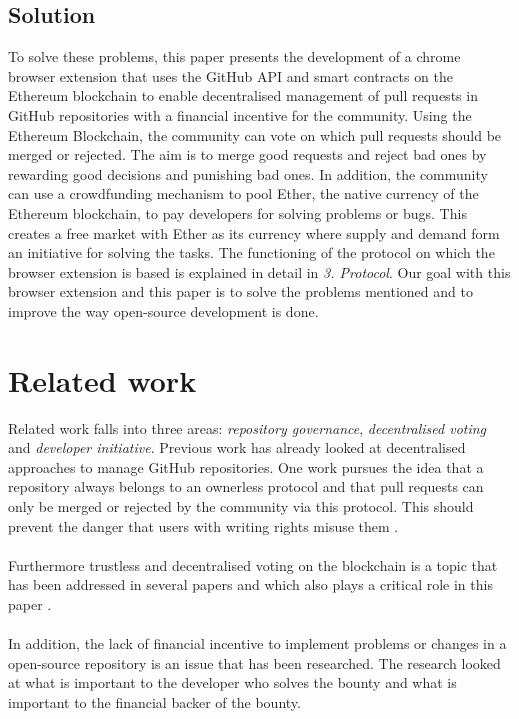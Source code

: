 \documentclass[sigconf]{acmart}
\begin{document}
\subsection{Solution}
To solve these problems, this paper presents the development of a chrome browser extension that uses the GitHub API  \cite{git2021api} and 
smart contracts \cite{eth2021contracts} on the Ethereum blockchain \cite{eth2021doc} to enable decentralised management of pull requests in GitHub repositories with a 
financial incentive for the community. Using the Ethereum Blockchain, the community can vote on which pull requests should be 
merged or rejected. The aim is to merge good requests and reject bad ones by rewarding good decisions and punishing bad ones. 
In addition, the community can 
use a crowdfunding mechanism to pool Ether, the native currency of the Ethereum blockchain, to pay developers for solving problems 
or bugs. This creates a free market with Ether as its currency where supply and demand form an initiative for solving the tasks. The functioning of the protocol on which the browser extension is based is explained in detail in \textit{3. Protocol}. Our goal with
 this browser extension and this paper is to solve the problems mentioned and to improve the way open-source development 
is done.

\section{Related work}
Related work falls into three areas: \textit{repository governance}, \textit{decentralised voting} and \textit{developer initiative}. 
Previous work has already looked at decentralised approaches to manage GitHub repositories. One work pursues the idea that 
a repository always belongs to an ownerless protocol and that pull requests can only be merged or rejected by the community 
via this protocol. This should prevent the danger that users with writing rights misuse them \cite{ulrich2020dev}. \\ \\
Furthermore trustless and decentralised voting on the blockchain is a topic that has been addressed in several papers 
and which also plays a critical role in this paper \cite{khoury2018decentralized, ulrich2020dev}. \\ \\
In addition, the lack of financial incentive to implement problems or changes in a open-source repository is an issue that 
has been researched. The research looked at what is important to the developer who solves the bounty and what is 
important to the financial backer of 
the bounty. \cite{zhou2019bounties}
\end{document}
